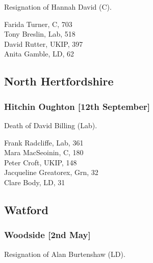 \documentclass[a4paper,openany,10pt]{book}
\begin{document}

Resignation of Hannah David (C).



Farida Turner, C, 703\\
Tony Breslin, Lab, 518\\
David Rutter, UKIP, 397\\
Anita Gamble, LD, 62\\


\subsection*{North Hertfordshire}

\subsubsection*{Hitchin Oughton \hspace*{\fill}\nolinebreak[1]%
\enspace\hspace*{\fill}
[12th September]}


Death of David Billing (Lab).



Frank Radcliffe, Lab, 361\\
Mara MacSeoinin, C, 180\\
Peter Croft, UKIP, 148\\
Jacqueline Greatorex, Grn, 32\\
Clare Body, LD, 31\\


\subsection*{Watford}

\subsubsection*{Woodside \hspace*{\fill}\nolinebreak[1]%
\enspace\hspace*{\fill}
[2nd May]}


Resignation of Alan Burtenshaw (LD).
\end{document}
